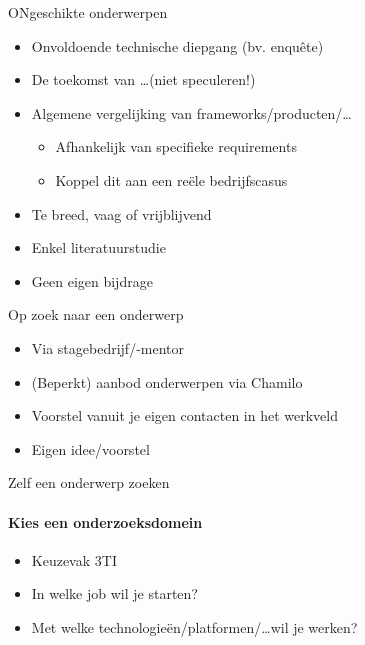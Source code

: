 \documentclass[usenames,dvipsnames]{beamer}
\begin{document}
\begin{frame}{ONgeschikte onderwerpen}

\begin{itemize}
  \item Onvoldoende technische diepgang (bv. enquête)
  \item De toekomst van \ldots (niet speculeren!)
  \item Algemene vergelijking van frameworks/producten/\ldots
  \begin{itemize}
    \item Afhankelijk van specifieke requirements
    \item Koppel dit aan een reële bedrijfscasus
  \end{itemize}
  \item Te breed, vaag of vrijblijvend
  \item Enkel literatuurstudie
  \item Geen eigen bijdrage
\end{itemize}

\end{frame}

\begin{frame}{Op zoek naar een onderwerp}

  \begin{itemize}
    \item Via stagebedrijf/-mentor
    \item (Beperkt) aanbod onderwerpen via Chamilo
    \item Voorstel vanuit je eigen contacten in het werkveld
    \item Eigen idee/voorstel
  \end{itemize}
  
\end{frame}

\begin{frame}{Zelf een onderwerp zoeken}
  \framesubtitle{Kies een onderzoeksdomein}

  \begin{itemize}
    \item Keuzevak 3TI
    \item In welke job wil je starten?
    \item Met welke technologieën/platformen/\ldots wil je werken?
  \end{itemize}

\end{frame}
\end{document}
